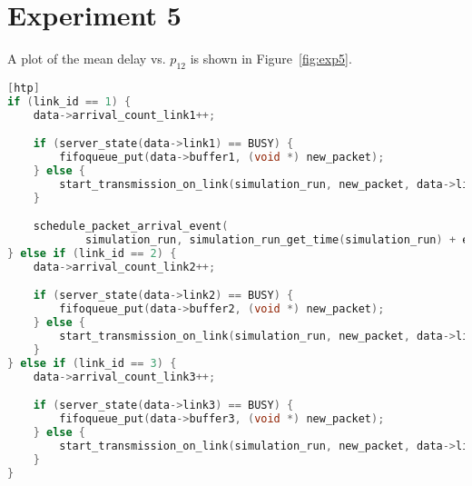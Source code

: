 \section*{Experiment 5}

A plot of the mean delay vs. $p_{12}$ is shown in Figure~\ref{fig:exp5}.

\begin{lstlisting}[language=C, caption={Modifications to Experiment 5 Code}, label={list:exp5}][htp]
if (link_id == 1) {
    data->arrival_count_link1++;

    if (server_state(data->link1) == BUSY) {
        fifoqueue_put(data->buffer1, (void *) new_packet);
    } else {
        start_transmission_on_link(simulation_run, new_packet, data->link1);
    }

    schedule_packet_arrival_event(
            simulation_run, simulation_run_get_time(simulation_run) + exponential_generator((double) 1 / LINK1_PACKET_ARRIVAL_RATE), 1);
} else if (link_id == 2) {
    data->arrival_count_link2++;

    if (server_state(data->link2) == BUSY) {
        fifoqueue_put(data->buffer2, (void *) new_packet);
    } else {
        start_transmission_on_link(simulation_run, new_packet, data->link2);
    }
} else if (link_id == 3) {
    data->arrival_count_link3++;

    if (server_state(data->link3) == BUSY) {
        fifoqueue_put(data->buffer3, (void *) new_packet);
    } else {
        start_transmission_on_link(simulation_run, new_packet, data->link3);
    }
}
\end{lstlisting}


